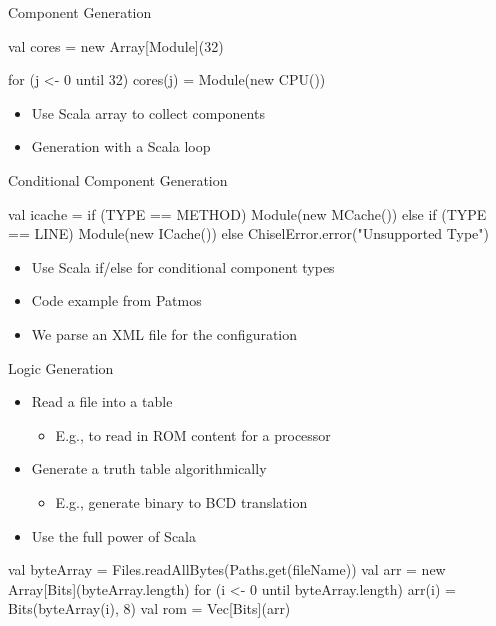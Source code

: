 \begin{frame}[fragile]{Component Generation}
\begin{chisel}
val cores = new Array[Module](32)

for (j <- 0 until 32)
  cores(j) = Module(new CPU())
\end{chisel}
\begin{itemize}
\item Use Scala array to collect components
\item Generation with a Scala loop
\end{itemize}
\end{frame}

\begin{frame}[fragile]{Conditional Component Generation}
\begin{chisel}
val icache =
  if (TYPE == METHOD)
    Module(new MCache())
  else if (TYPE == LINE)
    Module(new ICache())
  else
    ChiselError.error("Unsupported Type")
\end{chisel}
\begin{itemize}
\item Use Scala if/else for conditional component types
\item Code example from Patmos
\item We parse an XML file for the configuration
\end{itemize}
\end{frame}

\begin{frame}[fragile]{Logic Generation}
\begin{itemize}
\item Read a file into a table
\begin{itemize}
\item E.g., to read in ROM content for a processor
\end{itemize}
\item Generate a truth table algorithmically
\begin{itemize}
\item E.g., generate binary to BCD translation
\end{itemize}
\item Use the full power of Scala
\end{itemize}
\begin{chisel}
val byteArray = Files.readAllBytes(Paths.get(fileName))
val arr = new Array[Bits](byteArray.length)
for (i <- 0 until byteArray.length) {
  arr(i) = Bits(byteArray(i), 8)
}
val rom = Vec[Bits](arr)
\end{chisel}
\end{frame}

